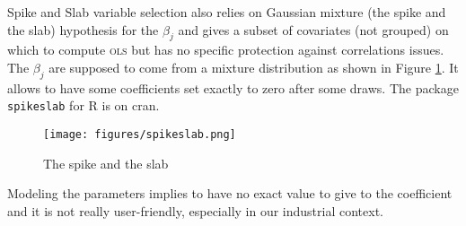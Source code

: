\documentclass[12pt,a4paper]{report}
\begin{document}
			Spike and Slab variable selection \cite{ishwaran2005spike} also relies on Gaussian mixture (the spike and the slab) hypothesis for the $\beta_j$ and gives a subset of covariates (not grouped) on which to compute \textsc{ols} but has no specific protection against correlations issues.  The $\beta_j$ are supposed to come from a mixture distribution as shown in Figure \ref{spikeslab}. It allows to have some coefficients set exactly to zero after some draws. The package {\tt spikeslab} for R is on {\sc cran}. \\
			
\begin{figure}[h!]
	\centering
	\texttt{[image: figures/spikeslab.png]} 
	\caption{The spike and the slab}\label{spikeslab}
\end{figure}		
		
		Modeling the parameters implies to have no exact value to give to the coefficient and it is not really user-friendly, especially in our industrial context. %
		
		\FloatBarrier
	
		
		
		
			
\end{document}
